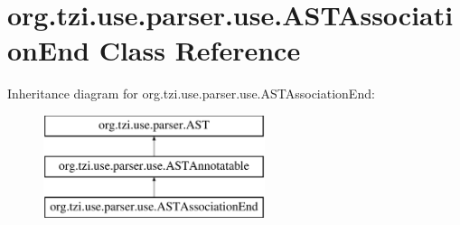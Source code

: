 \hypertarget{classorg_1_1tzi_1_1use_1_1parser_1_1use_1_1_a_s_t_association_end}{\section{org.\-tzi.\-use.\-parser.\-use.\-A\-S\-T\-Association\-End Class Reference}
\label{classorg_1_1tzi_1_1use_1_1parser_1_1use_1_1_a_s_t_association_end}
}
Inheritance diagram for org.\-tzi.\-use.\-parser.\-use.\-A\-S\-T\-Association\-End\-:\begin{figure}[H]
\begin{center}
\leavevmode
\includegraphics[height=3.000000cm]{classorg_1_1tzi_1_1use_1_1parser_1_1use_1_1_a_s_t_association_end}
\end{center}
\end{figure}
